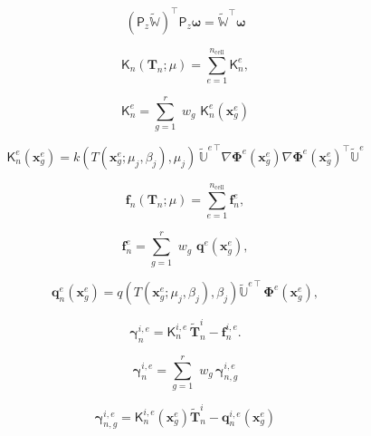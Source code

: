 \documentclass[11pt]{article}
\renewcommand{\vec}[1]{\mathbf{#1}}
\newcommand{\mat}[1]{\mathsf{#1}}
\begin{document}
\begin{equation}
(\mat{P}_z\widetilde{\mathbb{W}})^{\top} \mat{P}_z\boldsymbol{\omega} = \widetilde{\mathbb{W}}^{\top} \boldsymbol\omega
\end{equation}

\begin{equation}
	\mat{K}_n(\mathbf{T}_n; \mu)  = \sum_{e=1}^{n_{\text{cell}}} \mat{K}^e_n,
	\label{eq:elemental_contrib_K_red}
\end{equation}

\begin{equation}
\mat{K}_n^e = \sum_{g=1}^{r}\,\,w_g\,\, \mat{K}_n^e(\vec{x}^e_g)
\end{equation}

\begin{equation}
\mathsf{K}_n^e(\vec{x}^e_g) =  k({T}(\vec{x}^{e}_{g};\mu_j,\beta_j),\mu_j)\,\widetilde{\mathbb{U}}^{e\,\top}{\nabla \boldsymbol\Phi}^e(\vec{x}^{e}_g) {\nabla\boldsymbol\Phi}^e(\vec{x}^{e}_g)^\top\widetilde{\mathbb{U}}^e  
\label{eq:elemental_stiffness_matrix}
\end{equation}

\begin{equation}
	\vec{f}_n(\mathbf{T}_n; \mu) = \sum_{e=1}^{n_{\text{cell}}} \vec{f}^e_n,
	\label{eq:elemental_contrib_f_red}
\end{equation}

\begin{equation}
	\vec{f}^e_n = \sum_{g=1}^{r} \,\, w_g \,\, \vec{q}^e(\vec{x}^e_g),
	\label{eq:elemental_force_vector}
\end{equation}

\begin{equation}
\vec{q}_n^e(\vec{x}^e_g) = q(T(\vec{x}^{e}_{g}; \mu_j, \beta_j),\beta_j) \widetilde{\mathbb{U}}^{e\,\top} \, \boldsymbol\Phi^{e}(\vec{x}^{e}_g),
\label{eq:source_term_expression}
\end{equation}

\begin{equation}
    \boldsymbol{\gamma}^{i,e}_{n} = \mat{K}^{i,e}_n \,\widetilde{\vec{T}}^i_n - \vec{f}^{i,e}_n.
\end{equation}

\begin{equation}
    \boldsymbol{\gamma}^{i,e}_{n} = \sum_{g=1}^{r}\,\,w_g\,\boldsymbol{\gamma}^{i,e}_{n,g}
\end{equation}

\begin{equation}
    \boldsymbol{\gamma}^{i,e}_{n,g} = \mat{K}_n^{i,e}(\vec{x}^e_g)\widetilde{\vec{T}}^i_n - \vec{q}_n^{i,e}(\vec{x}^e_g)
\end{equation}
\end{document}
